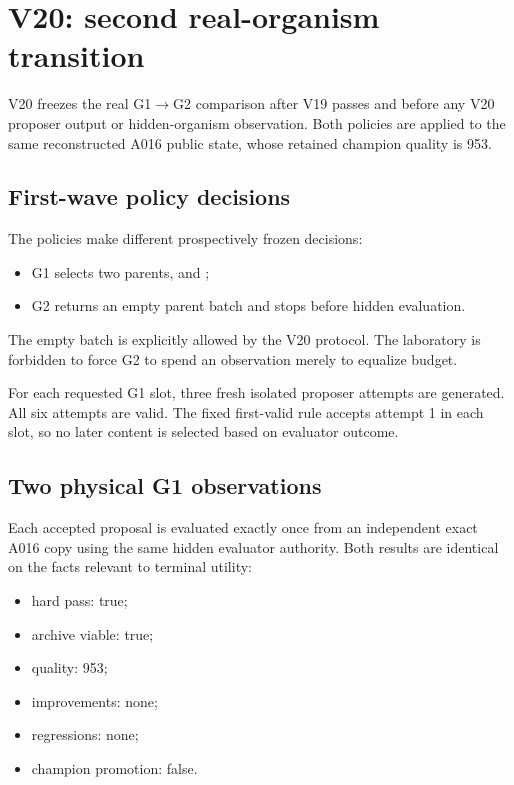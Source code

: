 \section{V20: second real-organism transition}

V20 freezes the real G1$\rightarrow$G2 comparison after V19 passes and before any V20 proposer output or hidden-organism observation. Both policies are applied to the same reconstructed A016 public state, whose retained champion quality is 953.

\subsection{First-wave policy decisions}

The policies make different prospectively frozen decisions:
\begin{itemize}
  \item G1 selects two parents,  and ;
  \item G2 returns an empty parent batch and stops before hidden evaluation.
\end{itemize}

The empty batch is explicitly allowed by the V20 protocol. The laboratory is forbidden to force G2 to spend an observation merely to equalize budget.

For each requested G1 slot, three fresh isolated proposer attempts are generated. All six attempts are valid. The fixed first-valid rule accepts attempt 1 in each slot, so no later content is selected based on evaluator outcome.

\subsection{Two physical G1 observations}

Each accepted proposal is evaluated exactly once from an independent exact A016 copy using the same hidden evaluator authority. Both results are identical on the facts relevant to terminal utility:
\begin{itemize}
  \item hard pass: true;
  \item archive viable: true;
  \item quality: 953;
  \item improvements: none;
  \item regressions: none;
  \item champion promotion: false.
\end{itemize}

